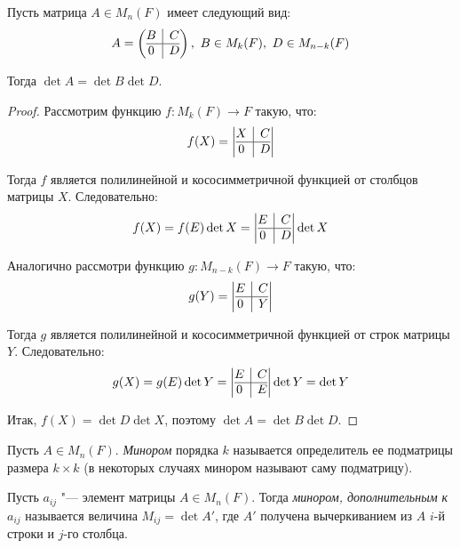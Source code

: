\begin{theorem}
	Пусть матрица $A \in M_n(F)$ имеет следующий вид:
	\[A = \left(\begin{array}{@{}c|c@{}}
		B & C\\
		\hline
		0 & D
	\end{array}\right),~B \in M_k(F),~D \in M_{n - k}(F)\]
	
	Тогда $\det{A} = \det{B}\det{D}$.
\end{theorem}

\begin{proof}
	Рассмотрим функцию $f : M_k(F) \rightarrow F$ такую, что:
	\[f(X) = \left|\begin{array}{@{}c|c@{}}
	X & C\\
	\hline
	0 & D
	\end{array}\right|\]
	
	Тогда $f$ является полилинейной и кососимметричной функцией от столбцов матрицы $X$. Следовательно:
	\[f(X) = f(E)\det{X} = \left|\begin{array}{@{}c|c@{}}
	E & C\\
	\hline
	0 & D
	\end{array}\right|\det{X}\]
	
	Аналогично рассмотри функцию $g : M_{n - k}(F) \rightarrow F$ такую, что:
	\[g(Y) = \left|\begin{array}{@{}c|c@{}}
	E & C\\
	\hline
	0 & Y
	\end{array}\right|\]
	
	Тогда $g$ является полилинейной и кососимметричной функцией от строк матрицы $Y$. Следовательно:
	\[g(X) = g(E)\det{Y} = \left|\begin{array}{@{}c|c@{}}
	E & C\\
	\hline
	0 & E
	\end{array}\right|\det{Y} = \det{Y}\]
	
	Итак, $f(X) = \det{D}\det{X}$, поэтому $\det{A} = \det{B}\det{D}$.
\end{proof}

\begin{definition}
	Пусть $A \in M_n(F)$. \textit{Минором} порядка $k$ называется определитель ее подматрицы размера $k \times k$ (в некоторых случаях минором называют саму подматрицу).
\end{definition}

\begin{definition}
	Пусть $a_{ij}$ "--- элемент матрицы $A \in M_n(F)$. Тогда \textit{минором, дополнительным к} $a_{ij}$ называется величина $M_{ij} = \det{A'}$, где $A'$ получена вычеркиванием из $A$ $i$-й строки и $j$-го столбца.
\end{definition}

